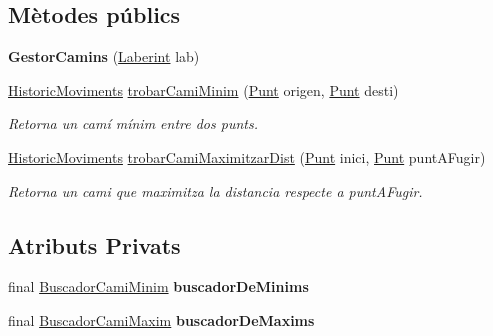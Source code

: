 \subsection*{Mètodes públics}
\begin{DoxyCompactItemize}
\item 
\hypertarget{classlogica_1_1algoritmica_1_1_gestor_camins_a042c8215a6d89097b5b8048a70872e35}{{\bfseries Gestor\+Camins} (\hyperlink{classlogica_1_1laberints_1_1_laberint}{Laberint} lab)}\label{classlogica_1_1algoritmica_1_1_gestor_camins_a042c8215a6d89097b5b8048a70872e35}

\item 
\hyperlink{classlogica_1_1historic__moviments_1_1_historic_moviments}{Historic\+Moviments} \hyperlink{classlogica_1_1algoritmica_1_1_gestor_camins_a5d7198aa32d0be2a72e15eda16f2ba3d}{trobar\+Cami\+Minim} (\hyperlink{classlogica_1_1_punt}{Punt} origen, \hyperlink{classlogica_1_1_punt}{Punt} desti)
\begin{DoxyCompactList}\small\item\em Retorna un camí mínim entre dos punts. \end{DoxyCompactList}\item 
\hyperlink{classlogica_1_1historic__moviments_1_1_historic_moviments}{Historic\+Moviments} \hyperlink{classlogica_1_1algoritmica_1_1_gestor_camins_abe60dac7f02241b56588f5518a4442ea}{trobar\+Cami\+Maximitzar\+Dist} (\hyperlink{classlogica_1_1_punt}{Punt} inici, \hyperlink{classlogica_1_1_punt}{Punt} punt\+A\+Fugir)
\begin{DoxyCompactList}\small\item\em Retorna un cami que maximitza la distancia respecte a punt\+A\+Fugir. \end{DoxyCompactList}\end{DoxyCompactItemize}
\subsection*{Atributs Privats}
\begin{DoxyCompactItemize}
\item 
\hypertarget{classlogica_1_1algoritmica_1_1_gestor_camins_a6bc71429e7e340432b49000840457749}{final \hyperlink{classlogica_1_1algoritmica_1_1_a_estrella_1_1_buscador_cami_minim}{Buscador\+Cami\+Minim} {\bfseries buscador\+De\+Minims}}\label{classlogica_1_1algoritmica_1_1_gestor_camins_a6bc71429e7e340432b49000840457749}

\item 
\hypertarget{classlogica_1_1algoritmica_1_1_gestor_camins_a473a3366bcd88f358e2b0b5101ac672f}{final \hyperlink{classlogica_1_1algoritmica_1_1_back_tracking_1_1_buscador_cami_maxim}{Buscador\+Cami\+Maxim} {\bfseries buscador\+De\+Maxims}}\label{classlogica_1_1algoritmica_1_1_gestor_camins_a473a3366bcd88f358e2b0b5101ac672f}

\end{DoxyCompactItemize}



